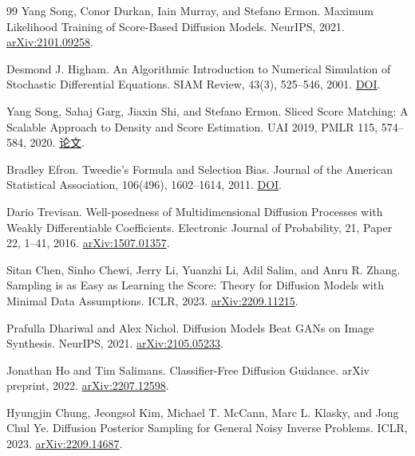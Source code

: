 \begin{thebibliography}{99}
Yang Song, Conor Durkan, Iain Murray, and Stefano Ermon.
\newblock Maximum Likelihood Training of Score-Based Diffusion Models.
\newblock NeurIPS, 2021.
\href{https://arxiv.org/abs/2101.09258}{arXiv:2101.09258}.

Desmond J. Higham.
\newblock An Algorithmic Introduction to Numerical Simulation of Stochastic Differential Equations.
\newblock SIAM Review, 43(3), 525--546, 2001.
\href{https://doi.org/10.1137/S0036144500378302}{DOI}.

Yang Song, Sahaj Garg, Jiaxin Shi, and Stefano Ermon.
\newblock Sliced Score Matching: A Scalable Approach to Density and Score Estimation.
\newblock UAI 2019, PMLR 115, 574--584, 2020.
\href{https://proceedings.mlr.press/v115/song20a.html}{论文}.

Bradley Efron.
\newblock Tweedie's Formula and Selection Bias.
\newblock Journal of the American Statistical Association, 106(496), 1602--1614, 2011.
\href{https://doi.org/10.1198/jasa.2011.tm11181}{DOI}.

Dario Trevisan.
\newblock Well-posedness of Multidimensional Diffusion Processes with Weakly Differentiable Coefficients.
\newblock Electronic Journal of Probability, 21, Paper 22, 1--41, 2016.
\href{https://arxiv.org/abs/1507.01357}{arXiv:1507.01357}.

Sitan Chen, Sinho Chewi, Jerry Li, Yuanzhi Li, Adil Salim, and Anru R. Zhang.
\newblock Sampling is as Easy as Learning the Score: Theory for Diffusion Models with Minimal Data Assumptions.
\newblock ICLR, 2023.
\href{https://arxiv.org/abs/2209.11215}{arXiv:2209.11215}.

Prafulla Dhariwal and Alex Nichol.
\newblock Diffusion Models Beat GANs on Image Synthesis.
\newblock NeurIPS, 2021.
\href{https://arxiv.org/abs/2105.05233}{arXiv:2105.05233}.

Jonathan Ho and Tim Salimans.
\newblock Classifier-Free Diffusion Guidance.
\newblock arXiv preprint, 2022.
\href{https://arxiv.org/abs/2207.12598}{arXiv:2207.12598}.

Hyungjin Chung, Jeongsol Kim, Michael T. McCann, Marc L. Klasky, and Jong Chul Ye.
\newblock Diffusion Posterior Sampling for General Noisy Inverse Problems.
\newblock ICLR, 2023.
\href{https://arxiv.org/abs/2209.14687}{arXiv:2209.14687}.

\end{thebibliography}
